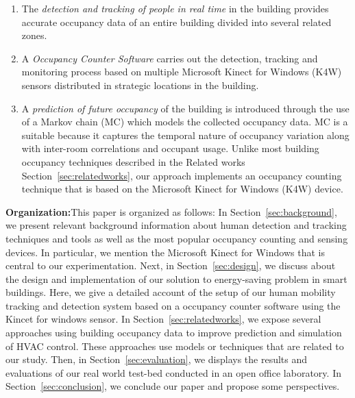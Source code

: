 \begin{enumerate}
\item  The {\em detection and tracking of people in real time} in the
  building provides accurate occupancy data of an entire building
  divided into several related zones.
\item  A  {\em Occupancy Counter Software} carries out the detection,
  tracking and monitoring process based on multiple Microsoft Kinect
  for Windows (K4W) sensors distributed in strategic locations in the
  building.
\item A {\em prediction of future occupancy} of the building is
  introduced through the use of a Markov chain (MC) which models the
  collected occupancy data.  MC is a suitable because it captures the
  temporal nature of occupancy variation along with inter-room
  correlations and occupant usage.  Unlike most building occupancy
  techniques described in the Related works
  Section~\ref{sec:relatedworks}, our approach implements an occupancy
  counting technique that is based on the Microsoft Kinect for Windows
  (K4W) device.
\end{enumerate}

{\bf Organization:}This paper is organized as follows: In
Section~\ref{sec:background}, we present relevant background
information about human detection and tracking techniques and tools as
well as the most popular occupancy counting and sensing devices. In
particular, we mention the Microsoft Kinect for Windows that is
central to our experimentation. Next, in Section~\ref{sec:design}, we
discuss about the design and implementation of our solution to
energy-saving problem in smart buildings.  Here, we give a detailed
account of the setup of our human mobility tracking and detection
system based on a occupancy counter software using the Kincet for
windows sensor. In Section~\ref{sec:relatedworks}, we expose several
approaches using building occupancy data to improve prediction and
simulation of HVAC control. These approaches use models or techniques
that are related  to our study. Then, in Section~\ref{sec:evaluation},
we displays the results and evaluations of our real world test-bed
conducted in an open office laboratory.  In
Section~\ref{sec:conclusion}, we conclude our paper and propose some
perspectives. 

